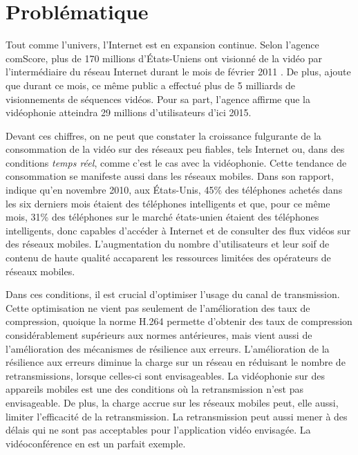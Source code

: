 \section*{Problématique}

Tout comme l'univers, l'Internet est en expansion continue. Selon l'agence
comScore, plus de 170 millions d'États-Uniens ont visionné de la vidéo par
l'intermédiaire du réseau Internet durant le mois de février 2011
\citep{ComScore2011}. De plus, \citet{ComScore2011} ajoute que durant ce mois,
ce même public a effectué plus de 5 milliards de visionnements de séquences
vidéos. Pour sa part, l'agence \citet{Juniper2010} affirme que la vidéophonie
atteindra 29 millions d'utilisateurs d'ici 2015.

Devant ces chiffres, on ne peut que constater la croissance fulgurante de la
consommation de la vidéo sur des réseaux peu fiables, tels Internet ou, dans des
conditions \textit{temps réel}, comme c'est le cas avec la vidéophonie. Cette
tendance de consommation se manifeste aussi dans les réseaux mobiles. Dans son
rapport, \citet{Nielsen2011} indique qu'en novembre 2010, aux États-Unis, 45\%
des téléphones achetés dans les six derniers mois étaient des téléphones
intelligents et que, pour ce même mois, 31\% des téléphones sur le marché
états-unien étaient des téléphones intelligents, donc capables d'accéder à
Internet et de consulter des flux vidéos sur des réseaux mobiles. L'augmentation
du nombre d'utilisateurs et leur soif de contenu de haute qualité accaparent les
ressources limitées des opérateurs de réseaux mobiles.

Dans ces conditions, il est crucial d'optimiser l'usage du canal de
transmission. Cette optimisation ne vient pas seulement de l'amélioration des
taux de compression, quoique la norme H.264 permette d'obtenir des taux de
compression considérablement supérieurs aux normes antérieures, mais vient aussi
de l'amélioration des mécanismes de résilience aux erreurs. L'amélioration de la
résilience aux erreurs diminue la charge sur un réseau en réduisant le nombre de
retransmissions, lorsque celles-ci sont envisageables. La vidéophonie sur des
appareils mobiles est une des conditions où la retransmission n'est pas
envisageable. De plus, la charge accrue sur les réseaux mobiles peut, elle
aussi, limiter l'efficacité de la retransmission. La retransmission peut aussi
mener à des délais qui ne sont pas acceptables pour l'application vidéo
envisagée. La vidéoconférence en est un parfait exemple.

